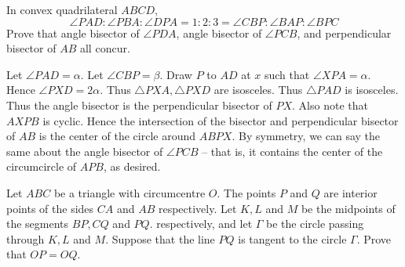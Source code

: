 \documentclass[11pt]{scrartcl}
\begin{document}
\begin{example}
  [IMO 2020]
  In convex quadrilateral $ABCD$,
  $$\angle PAD:\angle PBA:\angle DPA=1:2:3=\angle CBP:\angle BAP:\angle BPC$$
  Prove that angle bisector of $\angle PDA$, angle bisector of $\angle PCB$, and perpendicular bisector
  of $AB$ all concur.
\end{example}
\begin{soln}
  Let $\angle PAD=\alpha$. Let $\angle CBP=\beta$. Draw $P$ to $AD$ at $x$
  such that $\angle XPA=\alpha$. Hence $\angle PXD=2\alpha$. Thus
  $\triangle PXA, \triangle PXD$ are isosceles. Thus $\triangle PAD$ is isosceles.
  Thus the angle bisector is the perpendicular bisector of $PX$.
  Also note that $AXPB$ is cyclic. Hence the intersection of the bisector and
  perpendicular bisector of $AB$ is the center of the circle around $ABPX$.
  By symmetry, we can say the same about the angle bisector of $\angle PCB$ --
  that is, it contains the center of the circumcircle of $APB$, as desired.
\end{soln}
\begin{example}
  [IMO 2009]
  Let $ ABC$ be a triangle with circumcentre $ O$. The points $ P$ and $ Q$ are interior points of the sides $ CA$ and $ AB$ respectively. Let $ K,L$ and $ M$ be the midpoints of the segments $ BP,CQ$ and $ PQ$. respectively, and let $ \Gamma$ be the circle passing through $ K,L$ and $ M$. Suppose that the line $ PQ$ is tangent to the circle $ \Gamma$. Prove that $ OP = OQ.$
\end{example}
\end{document}
